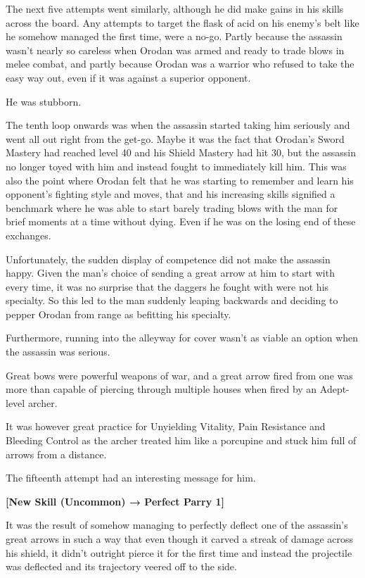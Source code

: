 \documentclass[a4paper,10pt]{book}
\begin{document}
The next five attempts went similarly, although he did make gains in his skills across the board. Any attempts to target the flask of acid on his enemy’s belt like he somehow managed the first time, were a no-go. Partly because the assassin wasn’t nearly so careless when Orodan was armed and ready to trade blows in melee combat, and partly because Orodan was a warrior who refused to take the easy way out, even if it was against a superior opponent.\par
He was stubborn.\par
The tenth loop onwards was when the assassin started taking him seriously and went all out right from the get-go. Maybe it was the fact that Orodan’s Sword Mastery had reached level 40 and his Shield Mastery had hit 30, but the assassin no longer toyed with him and instead fought to immediately kill him. This was also the point where Orodan felt that he was starting to remember and learn his opponent’s fighting style and moves, that and his increasing skills signified a benchmark where he was able to start barely trading blows with the man for brief moments at a time without dying. Even if he was on the losing end of these exchanges.\par
Unfortunately, the sudden display of competence did not make the assassin happy. Given the man’s choice of sending a great arrow at him to start with every time, it was no surprise that the daggers he fought with were not his specialty. So this led to the man suddenly leaping backwards and deciding to pepper Orodan from range as befitting his specialty.\par
Furthermore, running into the alleyway for cover wasn’t as viable an option when the assassin was serious.\par
Great bows were powerful weapons of war, and a great arrow fired from one was more than capable of piercing through multiple houses when fired by an Adept-level archer.\par
It was however great practice for Unyielding Vitality, Pain Resistance and Bleeding Control as the archer treated him like a porcupine and stuck him full of arrows from a distance.\par
The fifteenth attempt had an interesting message for him.\par
\textbf{[New Skill (Uncommon) → Perfect Parry 1]}\par
It was the result of somehow managing to perfectly deflect one of the assassin’s great arrows in such a way that even though it carved a streak of damage across his shield, it didn’t outright pierce it for the first time and instead the projectile was deflected and its trajectory veered off to the side.\par
\end{document}
